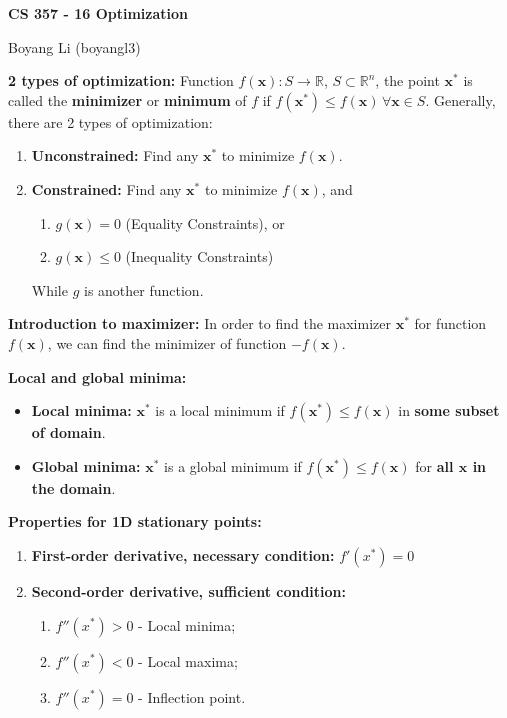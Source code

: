 \documentclass[12pt]{article}
\begin{document}
\begin{center}\Large\bf 
CS 357 - 16 Optimization\\
\end{center}
\begin{center}
Boyang Li (boyangl3)
\end{center}

\medskip
\noindent \textbf{2 types of optimization:} Function $f(\mathbf{x}) : S \to \mathbb{R}$, $S \subset \mathbb{R}^n$, the point $\mathbf{x}^*$ is called the \textbf{minimizer} or \textbf{minimum} of $f$ if $f(\mathbf{x}^*)\leq f(\mathbf{x}) \, \forall \mathbf{x} \in S$. Generally, there are 2 types of optimization:
\begin{enumerate}
    \item \textbf{Unconstrained:} Find any $\mathbf{x}^*$ to minimize $f(\mathbf{x})$.
    \item \textbf{Constrained:} Find any $\mathbf{x}^*$ to minimize $f(\mathbf{x})$, and 
        \begin{enumerate}
            \item $g(\mathbf{x}) = 0$ (Equality Constraints), or
            \item  $g(\mathbf{x}) \leq 0$ (Inequality Constraints)
        \end{enumerate}
        While $g$ is another function.
\end{enumerate}

\medskip
\noindent \textbf{Introduction to maximizer:} In order to find the maximizer $\mathbf{x}^*$ for function $f(\mathbf{x})$, we can find the minimizer of function $-f(\mathbf{x})$.

\medskip
\noindent \textbf{Local and global minima:}
    \begin{itemize}
        \item \textbf{Local minima:} $\mathbf{x}^*$ is a local minimum if $f(\mathbf{x}^*)\leq f(\mathbf{x})$ in \textbf{some subset of domain}.
        \item \textbf{Global minima:} $\mathbf{x}^*$ is a global minimum if $f(\mathbf{x}^*)\leq f(\mathbf{x})$ for \textbf{all $\mathbf{x}$ in the domain}.
    \end{itemize}

\medskip
\noindent \textbf{Properties for 1D stationary points:}
    \begin{enumerate}
        \item \textbf{First-order derivative, necessary condition:} $f'(x^*) = 0$
        \item \textbf{Second-order derivative, sufficient condition:}
            \begin{enumerate}
                \item $f''(x^*) > 0$ - Local minima;
                \item $f''(x^*) < 0$ - Local maxima;
                \item $f''(x^*) = 0$ - Inflection point.
            \end{enumerate}
    \end{enumerate}
\end{document}
